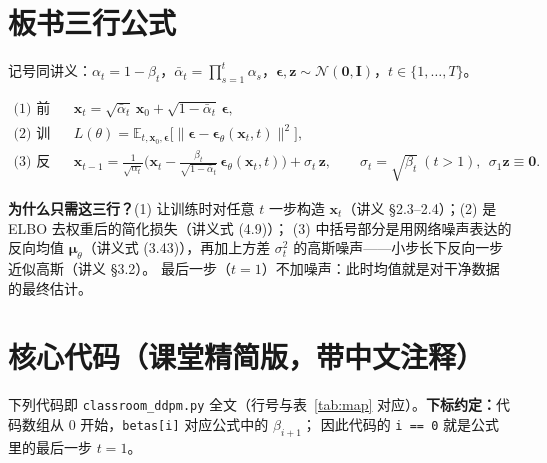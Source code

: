 \documentclass[a4paper,fontset=none,zihao=5]{ctexart}
\newcommand{\x}{\mathbf{x}}
\newcommand{\I}{\mathbf{I}}
\newcommand{\N}{\mathcal{N}}
\newcommand{\abar}{\bar{\alpha}}
\newcommand{\eps}{\boldsymbol{\epsilon}}
\newcommand{\epst}{\boldsymbol{\epsilon}_\theta}
\newcommand{\E}{\mathbb{E}}
\newcommand{\code}[1]{\texttt{#1}}
\begin{document}
\section{板书三行公式}
记号同讲义：$\alpha_t=1-\beta_t$，$\abar_t=\prod_{s=1}^t\alpha_s$，$\eps,\mathbf z\sim\N(\mathbf 0,\I)$，$t\in\{1,\dots,T\}$。
\begin{keybox}
\begin{align}
  \text{(1) 前向（闭式）：}\quad & \x_t=\sqrt{\abar_t}\,\x_0+\sqrt{1-\abar_t}\,\eps, \label{eq:fwd}\\
  \text{(2) 训练：}\quad & L(\theta)=\E_{t,\x_0,\eps}\Big[\big\|\eps-\epst(\x_t,t)\big\|^2\Big], \label{eq:loss}\\
  \text{(3) 反向一步：}\quad & \x_{t-1}=\frac{1}{\sqrt{\alpha_t}}\Big(\x_t-\frac{\beta_t}{\sqrt{1-\abar_t}}\,\epst(\x_t,t)\Big)+\sigma_t\,\mathbf z,\qquad
  \sigma_t=\sqrt{\beta_t}\ (t>1),\ \ \sigma_1\mathbf z\equiv\mathbf 0 . \label{eq:rev}
\end{align}
\end{keybox}
\begin{whybox}
\textbf{为什么只需这三行？}(1) 让训练时对任意 $t$ 一步构造 $\x_t$（讲义 §2.3–2.4）；(2) 是 ELBO 去权重后的简化损失（讲义式 (4.9)）；
(3) 中括号部分是用网络噪声表达的反向均值 $\boldsymbol\mu_\theta$（讲义式 (3.43)），再加上方差 $\sigma_t^2$ 的高斯噪声——小步长下反向一步近似高斯（讲义 §3.2）。
最后一步（$t=1$）不加噪声：此时均值就是对干净数据的最终估计。
\end{whybox}

\section{核心代码（课堂精简版，带中文注释）}
下列代码即 \code{classroom\_ddpm.py} 全文（行号与表~\ref{tab:map} 对应）。\textbf{下标约定：}代码数组从 0 开始，\code{betas[i]} 对应公式中的 $\beta_{i+1}$；
因此代码的 \code{i == 0} 就是公式里的最后一步 $t=1$。

\end{document}

